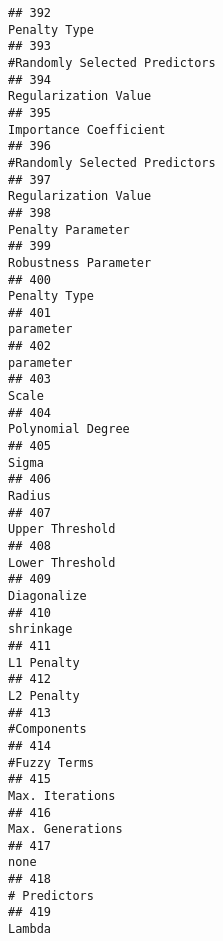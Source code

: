 \documentclass[
]{article}
\begin{document}
\begin{verbatim}
## 392                                                                            Penalty Type
## 393                                                           #Randomly Selected Predictors
## 394                                                                    Regularization Value
## 395                                                                  Importance Coefficient
## 396                                                           #Randomly Selected Predictors
## 397                                                                    Regularization Value
## 398                                                                       Penalty Parameter
## 399                                                                    Robustness Parameter
## 400                                                                            Penalty Type
## 401                                                                               parameter
## 402                                                                               parameter
## 403                                                                                   Scale
## 404                                                                       Polynomial Degree
## 405                                                                                   Sigma
## 406                                                                                  Radius
## 407                                                                         Upper Threshold
## 408                                                                         Lower Threshold
## 409                                                                             Diagonalize
## 410                                                                               shrinkage
## 411                                                                              L1 Penalty
## 412                                                                              L2 Penalty
## 413                                                                             #Components
## 414                                                                            #Fuzzy Terms
## 415                                                                         Max. Iterations
## 416                                                                        Max. Generations
## 417                                                                                    none
## 418                                                                            # Predictors
## 419                                                                                  Lambda

\end{verbatim}
\end{document}
